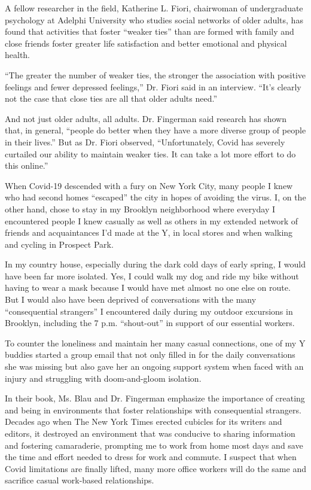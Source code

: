 A fellow researcher in the field, Katherine L. Fiori, chairwoman of
undergraduate psychology at Adelphi University who studies social
networks of older adults, has found that activities that foster ``weaker
ties'' than are formed with family and close friends foster greater life
satisfaction and better emotional and physical health.

``The greater the number of weaker ties, the stronger the association
with positive feelings and fewer depressed feelings,'' Dr. Fiori said in
an interview. ``It's clearly not the case that close ties are all that
older adults need.''

And not just older adults, all adults. Dr. Fingerman said research has
shown that, in general, ``people do better when they have a more diverse
group of people in their lives.'' But as Dr. Fiori observed,
``Unfortunately, Covid has severely curtailed our ability to maintain
weaker ties. It can take a lot more effort to do this online.''

When Covid-19 descended with a fury on New York City, many people I knew
who had second homes ``escaped'' the city in hopes of avoiding the
virus. I, on the other hand, chose to stay in my Brooklyn neighborhood
where everyday I encountered people I knew casually as well as others in
my extended network of friends and acquaintances I'd made at the Y, in
local stores and when walking and cycling in Prospect Park.

In my country house, especially during the dark cold days of early
spring, I would have been far more isolated. Yes, I could walk my dog
and ride my bike without having to wear a mask because I would have met
almost no one else on route. But I would also have been deprived of
conversations with the many ``consequential strangers'' I encountered
daily during my outdoor excursions in Brooklyn, including the 7 p.m.
``shout-out'' in support of our essential workers.

To counter the loneliness and maintain her many casual connections, one
of my Y buddies started a group email that not only filled in for the
daily conversations she was missing but also gave her an ongoing support
system when faced with an injury and struggling with doom-and-gloom
isolation.

In their book, Ms. Blau and Dr. Fingerman emphasize the importance of
creating and being in environments that foster relationships with
consequential strangers. Decades ago when The New York Times erected
cubicles for its writers and editors, it destroyed an environment that
was conducive to sharing information and fostering camaraderie,
prompting me to work from home most days and save the time and effort
needed to dress for work and commute. I suspect that when Covid
limitations are finally lifted, many more office workers will do the
same and sacrifice casual work-based relationships.

